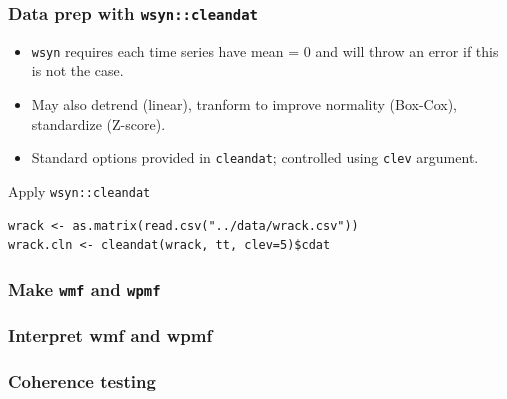 \documentclass{beamer}
\begin{document}
\begin{frame}[fragile]
\frametitle{Data prep with \texttt{wsyn::cleandat}}
\begin{itemize}
\item \texttt{wsyn} requires each time series have mean = 0 and will throw an error if this is not the case.
\item May also detrend (linear), tranform to improve normality (Box-Cox), standardize (Z-score). 
\item Standard options provided in \texttt{cleandat}; controlled using \texttt{clev} argument.
\end{itemize}
\begin{exampleblock}{Apply \texttt{wsyn::cleandat}}
\begin{verbatim}
wrack <- as.matrix(read.csv("../data/wrack.csv"))
wrack.cln <- cleandat(wrack, tt, clev=5)$cdat 
\end{verbatim}
\end{exampleblock}
\end{frame}

\begin{frame}[fragile]
\frametitle{Make \texttt{wmf} and \texttt{wpmf}}
\end{frame}

\begin{frame}
\frametitle{Interpret wmf and wpmf}
\end{frame}

\begin{frame}
\frametitle{Coherence testing}

\end{frame}


\begin{frame}

\end{frame}
\end{document}

